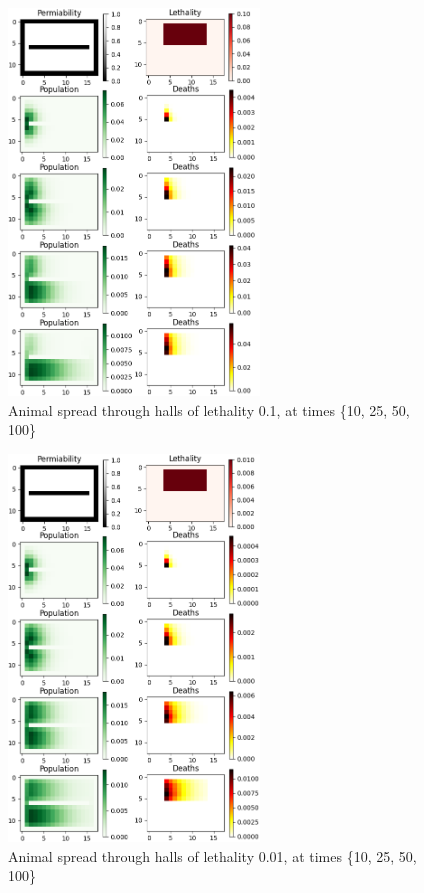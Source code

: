 \documentclass[twocolumn]{article}
\begin{document}
\begin{figure}[h!]
	\begin{center}
		\includegraphics[width=18em]{halls_lethality_10.png}
		\caption{Animal spread through halls of lethality 0.1, at times \{10, 25, 50, 100\}}
		\label{fig:halls_lethality_10}
	\end{center}
\end{figure}

\begin{figure}[h!]
	\begin{center}
		\includegraphics[width=18em]{halls_lethality_100.png}
		\caption{Animal spread through halls of lethality 0.01, at times \{10, 25, 50, 100\}}
		\label{fig:halls_lethality_100}
	\end{center}
\end{figure}
\end{document}

